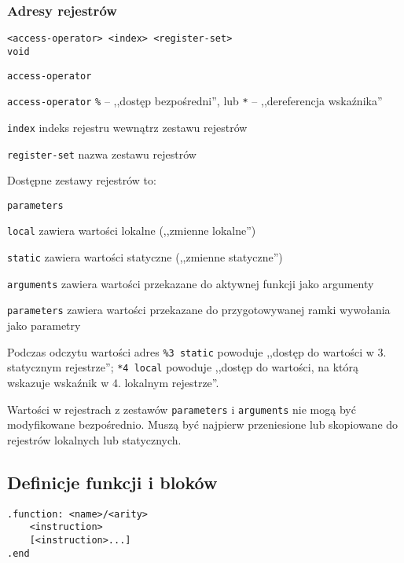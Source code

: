 \subsubsection{Adresy rejestrów}
\label{appendix_viua_vm_assembly_language_register_addrs}

\begin{lstlisting}
<access-operator> <index> <register-set>
void
\end{lstlisting}

\begin{labeling}{\texttt{access-operator}}
\item[\texttt{access-operator}] \texttt{\%} -- ,,dostęp bezpośredni'', lub
	\texttt{*} -- ,,dereferencja wskaźnika''
\item[\texttt{index}] indeks rejestru wewnątrz zestawu rejestrów
\item[\texttt{register-set}] nazwa zestawu rejestrów
\end{labeling}

Dostępne zestawy rejestrów to:

\begin{labeling}{\texttt{parameters}}
\item[\texttt{local}] zawiera wartości lokalne (,,zmienne lokalne'')
\item[\texttt{static}] zawiera wartości statyczne (,,zmienne statyczne'')
\item[\texttt{arguments}] zawiera wartości przekazane do aktywnej funkcji jako argumenty
\item[\texttt{parameters}] zawiera wartości przekazane do przygotowywanej ramki wywołania jako parametry
\end{labeling}

Podczas odczytu wartości adres \texttt{\%3 static} powoduje ,,dostęp do wartości w 3. statycznym rejestrze'';
\texttt{*4 local} powoduje ,,dostęp do wartości, na którą wskazuje wskaźnik w 4. lokalnym rejestrze''.

Wartości w rejestrach z zestawów \texttt{parameters} i \texttt{arguments} nie mogą być modyfikowane
bezpośrednio. Muszą być najpierw przeniesione lub skopiowane do rejestrów lokalnych lub statycznych.

\subsection{Definicje funkcji i bloków}

\begin{lstlisting}
.function: <name>/<arity>
	<instruction>
	[<instruction>...]
.end
\end{lstlisting}

